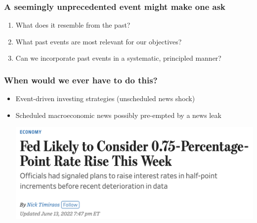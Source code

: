 \documentclass[9pt]{beamer}
\theoremstyle{definition}
\begin{document}
\begin{frame}
\frametitle{A seemingly unprecedented event might make one ask}
\begin{enumerate}
    \item <1-> What does it resemble from the past?
    \item <2-> What past events are most relevant for our objectives?
    \item <3-> Can we incorporate past events in a systematic, principled manner?
\end{enumerate}
\end{frame}

\begin{frame}
    \frametitle{When would we ever have to do this?}

    \begin{itemize}
        \item <1-> Event-driven investing strategies (unscheduled news shock)
        \item <2-> Scheduled macroeconomic news possibly pre-empted by a news leak
        

        \href{https://www.wsj.com/articles/bad-inflation-reports-raise-odds-of-surprise-0-75-percentage-point-rate-rise-this-week-11655147927}{\includegraphics[scale=.3]{WSJ_rate_hike_2022.png}}
    \end{itemize}
\end{frame}
\end{document}
